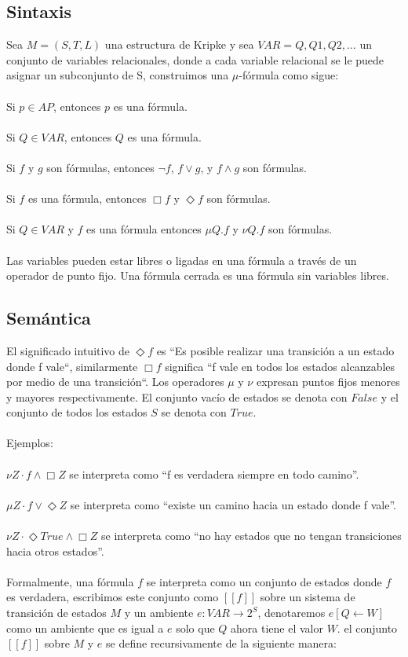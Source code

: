 \subsection{Sintaxis}

Sea $M = (S, T, L)$ una estructura de Kripke y sea $VAR = {Q, Q1, Q2, …}$ un conjunto de variables relacionales, donde a cada variable relacional se le puede asignar un subconjunto de S, construimos una $\mu$-fórmula como sigue: \\
\\
Si $p \in AP$, entonces $p$ es una fórmula. \\
\\
Si $Q \in VAR$, entonces $Q$ es una fórmula. \\
\\
Si $f$ y $g$ son fórmulas, entonces $\neg f$, $f \lor g$, y $f \land g$ son fórmulas. \\
\\
Si $f$ es una fórmula, entonces $\Box f$ y $\Diamond f$ son fórmulas. \\
\\
Si $Q \in VAR$ y $f$ es una fórmula entonces $\mu Q.f$ y $\nu Q.f$ son fórmulas. \\
\\
Las variables pueden estar libres o ligadas en una fórmula a través de un operador de punto fijo. Una fórmula cerrada es una fórmula sin variables libres.

\subsection{Semántica}

El significado intuitivo de $\Diamond f$ es “Es posible realizar una transición a un estado donde f vale“, similarmente $\Box f$ significa “f vale en todos los estados alcanzables por medio de una transición“.
Los operadores $\mu$ y $\nu$ expresan puntos fijos menores y mayores respectivamente. El conjunto vacío de estados se denota con $False$ y el conjunto de todos los estados $S$ se denota con $True$.\\
\\
Ejemplos: \\
\\
$\nu Z \cdot f \land \Box Z$ se interpreta como “f es verdadera siempre en todo camino”.\\
\\
$\mu Z \cdot f \lor \Diamond Z$ se interpreta como “existe un camino hacia un estado donde f vale”.\\
\\
$\nu Z \cdot \Diamond True \land \Box Z$ se interpreta como “no hay estados que no tengan transiciones hacia otros estados”.\\
\\
Formalmente, una fórmula $f$ se interpreta como un conjunto de estados donde $f$ es verdadera, escribimos este conjunto como $[[f]]$ sobre un sistema de transición de estados $M$ y un ambiente $e: VAR \to 2^{S}$, denotaremos $e[Q \gets W]$ como un ambiente que es igual a $e$ solo que $Q$ ahora tiene el valor $W$. el conjunto $[[f]]$ sobre $M$ y $e$ se define recursivamente de la siguiente manera:

